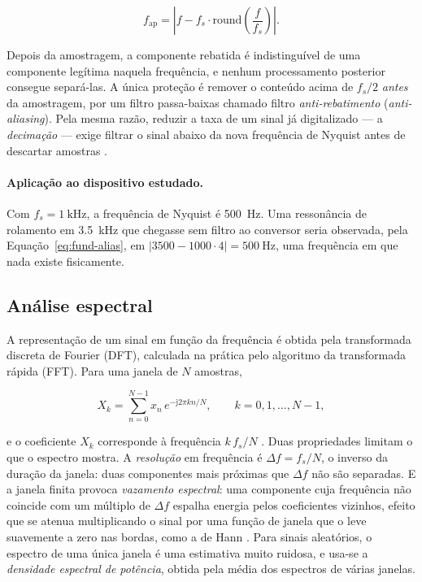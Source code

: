 \begin{equation}
f_{\mathrm{ap}} = \left| f - f_s \cdot \mathrm{round}\!\left(\frac{f}{f_s}\right) \right|.
\label{eq:fund-alias}
\end{equation}

Depois da amostragem, a componente rebatida é indistinguível de uma componente legítima
naquela frequência, e nenhum processamento posterior consegue separá-las. A única proteção
é remover o conteúdo acima de $f_s/2$ \emph{antes} da amostragem, por um filtro
passa-baixas chamado filtro \emph{anti-rebatimento} (\emph{anti-aliasing}). Pela mesma
razão, reduzir a taxa de um sinal já digitalizado --- a \emph{decimação} --- exige filtrar
o sinal abaixo da nova frequência de Nyquist antes de descartar amostras \cite{brandt2011}.

\paragraph{Aplicação ao dispositivo estudado.} Com $f_s = \SI{1}{\kilo\hertz}$, a
frequência de Nyquist é \SI{500}{\hertz}. Uma ressonância de rolamento em
\SI{3,5}{\kilo\hertz} que chegasse sem filtro ao conversor seria observada, pela
Equação~\eqref{eq:fund-alias}, em $|3500 - 1000 \cdot 4| = \SI{500}{\hertz}$, uma
frequência em que nada existe fisicamente.

\subsection{Análise espectral}
\label{sec:fund-espectro}

A representação de um sinal em função da frequência é obtida pela transformada discreta
de Fourier (DFT), calculada na prática pelo algoritmo da transformada rápida (FFT). Para
uma janela de $N$ amostras,

\begin{equation}
X_k = \sum_{n=0}^{N-1} x_n\, e^{-\mathrm{j}2\pi k n / N}, \qquad k = 0, 1, \dots, N-1,
\label{eq:fund-dft}
\end{equation}

\noindent
e o coeficiente $X_k$ corresponde à frequência $k\,f_s/N$ \cite{brandt2011}. Duas
propriedades limitam o que o espectro mostra. A \emph{resolução} em frequência é
$\Delta f = f_s/N$, o inverso da duração da janela: duas componentes mais próximas que
$\Delta f$ não são separadas. E a janela finita provoca \emph{vazamento espectral}: uma
componente cuja frequência não coincide com um múltiplo de $\Delta f$ espalha energia
pelos coeficientes vizinhos, efeito que se atenua multiplicando o sinal por uma função de
janela que o leve suavemente a zero nas bordas, como a de Hann \cite{brandt2011}. Para
sinais aleatórios, o espectro de uma única janela é uma estimativa muito ruidosa, e
usa-se a \emph{densidade espectral de potência}, obtida pela média dos espectros de várias
janelas.

